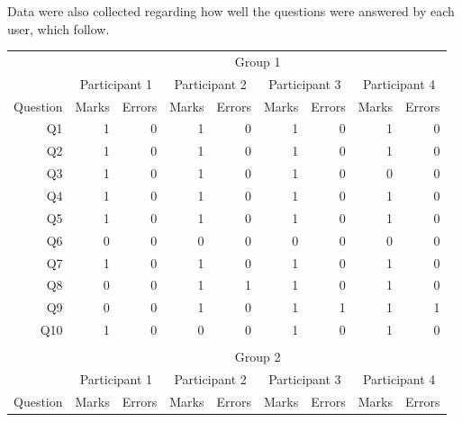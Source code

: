 \documentclass[12pt,twoside,notitlepage,xetex]{report}
\begin{document}
Data were also collected regarding how well the questions were answered by each
user, which follow.

\begin{center}
\begin{table}[H]
\begin{center}
\begin{tabular}{|r||r|r||r|r||r|r||r|r|}
\cline{2-9}
\multicolumn{1}{c|}{} & \multicolumn{8}{c|}{Group 1}\\ \cline{2-9}
\multicolumn{1}{c|}{} & \multicolumn{2}{c||}{Participant 1} & \multicolumn{2}{c||}{Participant 2} & \multicolumn{2}{c||}{Participant 3} & \multicolumn{2}{c|}{Participant 4}\\ \hline
\multicolumn{1}{|c||}{Question} & \multicolumn{1}{c|}{Marks} & \multicolumn{1}{c||}{Errors} & \multicolumn{1}{c|}{Marks} & \multicolumn{1}{c||}{Errors} & \multicolumn{1}{c|}{Marks} & \multicolumn{1}{c||}{Errors} & \multicolumn{1}{c|}{Marks} & \multicolumn{1}{c|}{Errors}\\ \hline \hline
Q1 & 1 & 0 & 1 & 0 & 1 & 0 & 1 & 0\\ \hline
Q2 & 1 & 0 & 1 & 0 & 1 & 0 & 1 & 0\\ \hline
Q3 & 1 & 0 & 1 & 0 & 1 & 0 & 0 & 0\\ \hline
Q4 & 1 & 0 & 1 & 0 & 1 & 0 & 1 & 0\\ \hline
Q5 & 1 & 0 & 1 & 0 & 1 & 0 & 1 & 0\\ \hline
Q6 & 0 & 0 & 0 & 0 & 0 & 0 & 0 & 0\\ \hline
Q7 & 1 & 0 & 1 & 0 & 1 & 0 & 1 & 0\\ \hline
Q8 & 0 & 0 & 1 & 1 & 1 & 0 & 1 & 0\\ \hline
Q9 & 0 & 0 & 1 & 0 & 1 & 1 & 1 & 1\\ \hline
Q10 & 1 & 0 & 0 & 0 & 1 & 0 & 1 & 0\\ \hline
\multicolumn{9}{c}{}\\ \cline{2-9}
\multicolumn{1}{c|}{} & \multicolumn{8}{c|}{Group 2}\\ \cline{2-9}
\multicolumn{1}{c|}{} & \multicolumn{2}{c||}{Participant 1} & \multicolumn{2}{c||}{Participant 2} & \multicolumn{2}{c||}{Participant 3} & \multicolumn{2}{c|}{Participant 4}\\ \hline
\multicolumn{1}{|c||}{Question} & \multicolumn{1}{c|}{Marks} & \multicolumn{1}{c||}{Errors} & \multicolumn{1}{c|}{Marks} & \multicolumn{1}{c||}{Errors} & \multicolumn{1}{c|}{Marks} & \multicolumn{1}{c||}{Errors} & \multicolumn{1}{c|}{Marks} & \multicolumn{1}{c|}{Errors}\\ \hline \hline

\end{tabular}
\end{center}
\end{table}
\end{center}
\end{document}
